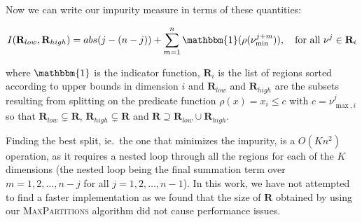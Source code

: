 Now we can write our impurity measure in terms of these quantities:

\[
    I(\mathbf{R}_{low}, \mathbf{R}_{high}) = abs(j - (n - j)) +
    \sum^{n}_{m=1} \mathbbm{1}(\rho(\nu^{j+m}_{\min})), \quad
    \text{for all }\nu^{j} \in \mathbf{R}_{i}
\]

\noindent
where $\mathbbm{1}$ is the indicator function, $\mathbf{R}_{i}$ is the list of
regions sorted according to upper bounds in dimension $i$ and $\mathbf{R}_{low}$ and
$\mathbf{R}_{high}$ are the subsets resulting from splitting on the predicate
function $\rho(x) = x_i \le c$ with $c = \nu^{j}_{\max,i}$ so that
$\mathbf{R}_{low} \subsetneq \mathbf{R}$, $\mathbf{R}_{high} \subsetneq
\mathbf{R}$ and $\mathbf{R} \supseteq \mathbf{R}_{low} \cup \mathbf{R}_{high}$.

Finding the best split, ie.\ the one that minimizes the impurity, is a $O(Kn^2)$
operation, as it requires a nested loop through all the regions for each
of the $K $dimensions (the nested loop being the final summation term over $m =
1, 2, \ldots, n - j$ for all $j = 1, 2, \ldots, n - 1$). In this work, we have
not attempted to find a faster implementation as we found that the size of
$\mathbf{R}$ obtained by using our \textsc{MaxPartitions} algorithm did not
cause performance issues.


